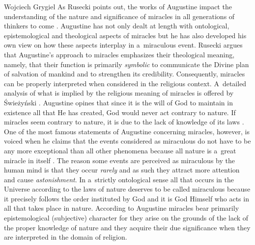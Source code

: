 \begin{artengenv}{Wojciech Grygiel}
As Rusecki points out, the works of Augustine impact the understanding of the nature and significance of miracles in all generations of thinkers to come
\parencite[][pp.35–36]{rusecki_traktat_2006}. %
 Augustine has not only dealt at length with ontological, epistemological and theological aspects of miracles but he has also developed his own view on how these aspects interplay in a~miraculous event. Rusecki argues that Augustine’s approach to miracles emphasizes their theological meaning, namely, that their function is primarily \textit{symbolic} to communicate the Divine plan of salvation of mankind and to strengthen its credibility. Consequently, miracles can be properly interpreted when considered in the religious context. A~detailed analysis of what is implied by the religious meaning of miracles is offered by Świeżyński 
\parencite*[][pp.225–273]{swiezynski_filozofia_2012}. %
 Augustine opines that since it is the will of God to maintain in existence all that He has created, God would never act contrary to nature. If miracles seem contrary to nature, it is due to the lack of knowledge of its laws 
\parencite[\textit{The City of God}, XXI.8][]{augustine_city_2003}. %
 One of the most famous statements of Augustine concerning miracles, however, is voiced when he claims that the events considered as miraculous do not have to be any more exceptional than all other phenomena because all nature is a~great miracle in itself 
\parencite[\textit{The City of God}, X.12; X.16-18; XXI.7; XXI.8][]{augustine_city_2003}. %
 The reason some events are perceived as miraculous by the human mind is that they occur \textit{rarely} and as such they attract more attention and cause \textit{astonishment}. In a~strictly ontological sense all that occurs in the Universe according to the laws of nature deserves to be called miraculous because it precisely follows the order instituted by God and it is God Himself who acts in all that takes place in nature. According to Augustine miracles bear primarily epistemological (subjective) character for they arise on the grounds of the lack of the proper knowledge of nature and they acquire their due significance when they are interpreted in the domain of religion.


\end{artengenv}
